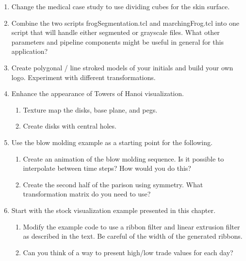 \begin{enumerate}
	\item Change the medical case study to use dividing cubes for the skin surface.

	\item Combine the two scripts frogSegmentation.tcl and marchingFrog.tcl into one script that will handle either segmented or grayscale files. What other parameters and pipeline components might be useful in general for this application?

	\item Create polygonal / line stroked models of your initials and build your own logo. Experiment with different transformations.

	\item Enhance the appearance of Towers of Hanoi visualization.
	\begin{enumerate}
		\item Texture map the disks, base plane, and pegs.
		\item Create disks with central holes.
	\end{enumerate}

	\item Use the blow molding example as a starting point for the
	following.
	\begin{enumerate}
		\item Create an animation of the blow molding sequence. Is it possible to interpolate between time steps? How would you do this?
		\item Create the second half of the parison using symmetry. What   transformation matrix do you need to use?
	\end{enumerate}

	\item Start with the stock visualization example presented in this chapter.
	\begin{enumerate}
		\item Modify the example code to use a ribbon filter and linear extrusion filter as described in the text. Be careful of the width of the   generated ribbons.
		\item Can you think of a way to present high/low trade values for each day?
	\end{enumerate}

\end{enumerate}
